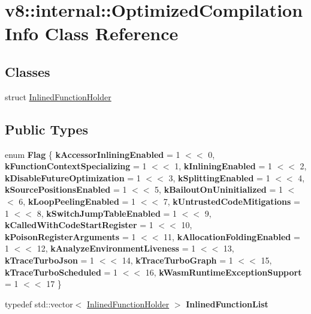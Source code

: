 \hypertarget{classv8_1_1internal_1_1OptimizedCompilationInfo}{}\section{v8\+:\+:internal\+:\+:Optimized\+Compilation\+Info Class Reference}
\label{classv8_1_1internal_1_1OptimizedCompilationInfo}
\subsection*{Classes}
\begin{DoxyCompactItemize}
\item 
struct \mbox{\hyperlink{structv8_1_1internal_1_1OptimizedCompilationInfo_1_1InlinedFunctionHolder}{Inlined\+Function\+Holder}}
\end{DoxyCompactItemize}
\subsection*{Public Types}
\begin{DoxyCompactItemize}
\item 
\mbox{\label{classv8_1_1internal_1_1OptimizedCompilationInfo_af9ead7f67938795b11c2dea0e2e175a6}} 
enum {\bfseries Flag} \{ \newline
{\bfseries k\+Accessor\+Inlining\+Enabled} = 1 $<$$<$ 0, 
{\bfseries k\+Function\+Context\+Specializing} = 1 $<$$<$ 1, 
{\bfseries k\+Inlining\+Enabled} = 1 $<$$<$ 2, 
{\bfseries k\+Disable\+Future\+Optimization} = 1 $<$$<$ 3, 
\newline
{\bfseries k\+Splitting\+Enabled} = 1 $<$$<$ 4, 
{\bfseries k\+Source\+Positions\+Enabled} = 1 $<$$<$ 5, 
{\bfseries k\+Bailout\+On\+Uninitialized} = 1 $<$$<$ 6, 
{\bfseries k\+Loop\+Peeling\+Enabled} = 1 $<$$<$ 7, 
\newline
{\bfseries k\+Untrusted\+Code\+Mitigations} = 1 $<$$<$ 8, 
{\bfseries k\+Switch\+Jump\+Table\+Enabled} = 1 $<$$<$ 9, 
{\bfseries k\+Called\+With\+Code\+Start\+Register} = 1 $<$$<$ 10, 
{\bfseries k\+Poison\+Register\+Arguments} = 1 $<$$<$ 11, 
\newline
{\bfseries k\+Allocation\+Folding\+Enabled} = 1 $<$$<$ 12, 
{\bfseries k\+Analyze\+Environment\+Liveness} = 1 $<$$<$ 13, 
{\bfseries k\+Trace\+Turbo\+Json} = 1 $<$$<$ 14, 
{\bfseries k\+Trace\+Turbo\+Graph} = 1 $<$$<$ 15, 
\newline
{\bfseries k\+Trace\+Turbo\+Scheduled} = 1 $<$$<$ 16, 
{\bfseries k\+Wasm\+Runtime\+Exception\+Support} = 1 $<$$<$ 17
 \}
\item 
\mbox{\label{classv8_1_1internal_1_1OptimizedCompilationInfo_a4d89cf87592c78b349c989f13222f3f0}} 
typedef std\+::vector$<$ \mbox{\hyperlink{structv8_1_1internal_1_1OptimizedCompilationInfo_1_1InlinedFunctionHolder}{Inlined\+Function\+Holder}} $>$ {\bfseries Inlined\+Function\+List}
\end{DoxyCompactItemize}
